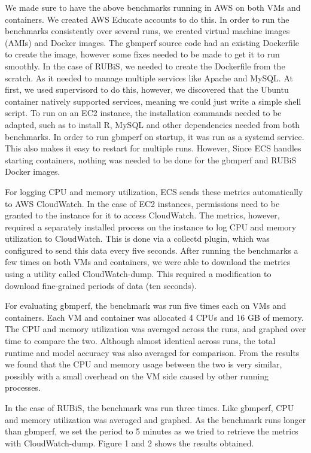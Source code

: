 \documentclass[11pt]{article}
\begin{document}
We made sure to have the above benchmarks running in AWS on both VMs and containers. We created AWS Educate accounts to do this. In order to run the benchmarks consistently over several runs, we created virtual machine images (AMIs) and Docker images. The gbmperf source code had an existing Dockerfile to create the image, however some fixes needed to be made to get it to run smoothly. In the case of RUBiS, we needed to create the Dockerfile from the scratch. As it needed to manage multiple services like Apache and MySQL. At first, we used supervisord to do this, however, we discovered that the Ubuntu container natively supported services, meaning we could just write a simple shell script. To run on an EC2 instance, the installation commands needed to be adapted, such as to install R, MySQL and other dependencies needed from both benchmarks. In order to run gbmperf on startup, it was run as a systemd service. This also makes it easy to restart for multiple runs. However, Since ECS handles starting containers, nothing was needed to be done for the gbmperf and RUBiS Docker images.

For logging CPU and memory utilization, ECS sends these metrics automatically to AWS CloudWatch. In the case of EC2 instances, permissions need to be granted to the instance for it to access CloudWatch. The metrics, however, required a separately installed process on the instance to log CPU and memory utilization to CloudWatch. This is done via a collectd plugin, which was configured to send this data every five seconds. After running the benchmarks a few times on both VMs and containers, we were able to download the metrics using a utility called CloudWatch-dump. This required a modification to download fine-grained periods of data (ten seconds).

For evaluating gbmperf, the benchmark was run five times each on VMs and containers. Each VM and container was allocated 4 CPUs and 16 GB of memory. The CPU and memory utilization was averaged across the runs, and graphed over time to compare the two. Although almost identical across runs, the total runtime and model accuracy was also averaged for comparison. From the results we found that the CPU and memory usage between the two is very similar, possibly with a small overhead on the VM side caused by other running processes.

In the case of RUBiS, the benchmark was run three times. Like gbmperf, CPU and memory utilization was averaged and graphed. As the benchmark runs longer than gbmperf, we set the period to 5 minutes as we tried to retrieve the metrics with CloudWatch-dump. Figure 1 and 2 shows the results obtained.
\end{document}
